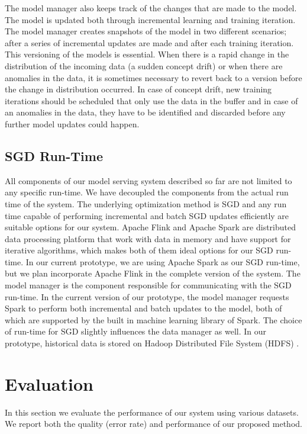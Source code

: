 \documentclass{vldb}
\begin{document}
The model manager also keeps track of the changes that are made to the model.
The model is updated both through incremental learning and training iteration.
The model manager creates snapshots of the model in two different scenarios; after a series of incremental updates are made and after each training iteration.
This versioning of the models is essential.
When there is a rapid change in the distribution of the incoming data (a sudden concept drift) or when there are anomalies in the data, it is sometimes necessary to revert back to a version before the change in distribution occurred.
In case of concept drift, new training iterations should be scheduled that only use the data in the buffer and in case of an anomalies in the data, they have to be identified and discarded before any further model updates could happen.

\subsection{SGD Run-Time} 
All components of our model serving system described so far are not limited to any specific run-time.
We have decoupled the components from the actual run time of the system.
The underlying optimization method is SGD and any run time capable of performing incremental and batch SGD updates efficiently are suitable options for our system.
Apache Flink \cite{carbone2015apache} and Apache Spark \cite{zaharia2010spark} are distributed data processing platform that work with data in memory and have support for iterative algorithms, which makes both of them ideal options for our SGD run-time.
In our current prototype, we are using Apache Spark \cite{zaharia2010spark} as our SGD run-time, but we plan incorporate Apache Flink in the complete version of the system.
The model manager is the component responsible for communicating with the SGD run-time.
In the current version of our prototype, the model manager requests Spark to perform both incremental and batch updates to the model, both of which are supported by the built in machine learning library of Spark.
The choice of run-time for SGD slightly influences the data manager as well.
In our prototype, historical data is stored on Hadoop Distributed File System (HDFS) \cite{shvachko2010hadoop}.

\section{Evaluation} \label{evaluation} 
In this section we evaluate the performance of our system using various datasets. 
We report both the quality (error rate) and performance of our proposed method. 
\end{document}
